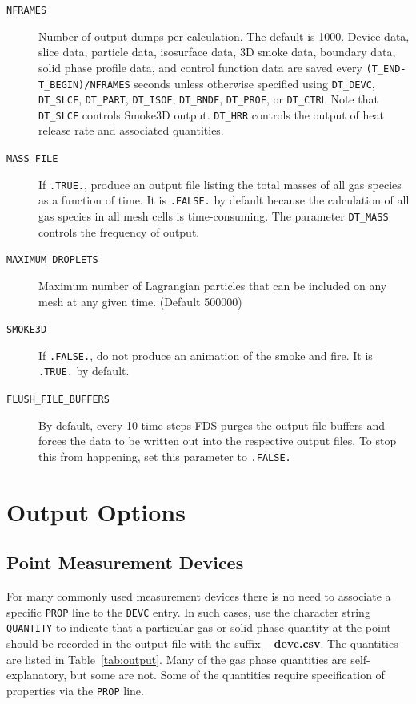 \documentclass[11pt]{book}
\newcommand{\ct}{\tt\small}
\begin{document}
\begin{description}
\item[{\ct NFRAMES}] Number of output dumps per calculation. The default is 1000.
Device data, slice data, particle data, isosurface data, 3D smoke data, boundary data, solid phase profile data, and
control function data are saved every {\ct (T\_END-T\_BEGIN)/NFRAMES} seconds unless otherwise specified
using {\ct DT\_DEVC}, {\ct DT\_SLCF}, {\ct DT\_PART}, {\ct DT\_ISOF}, {\ct DT\_BNDF}, {\ct DT\_PROF},
or {\ct DT\_CTRL} Note that {\ct DT\_SLCF} controls Smoke3D output. {\ct DT\_HRR} controls the
output of heat release rate and associated quantities.
\item[{\ct MASS\_FILE}] If {\ct .TRUE.}, produce an output file listing the total masses of all gas species as a function of time. It is {\ct .FALSE.} by default because the calculation
of all gas species in all mesh cells is time-consuming. The parameter {\ct DT\_MASS} controls the frequency of output.
\item[{\ct MAXIMUM\_DROPLETS}] Maximum number of Lagrangian particles that can be included on any
mesh at any given time. (Default 500000)
\item[{\ct SMOKE3D}] If {\ct .FALSE.}, do not produce an animation of the smoke and fire. It is {\ct .TRUE.} by default.
\item[{\ct FLUSH\_FILE\_BUFFERS}] By default, every 10 time steps FDS purges the output file buffers and forces the data to be written out into the respective output files. To stop
this from happening, set this parameter to {\ct .FALSE.}
\end{description}


\section{Output Options}

\subsection{Point Measurement Devices}
For many commonly used measurement devices there is no need to associate a
specific {\ct PROP} line to the {\ct DEVC} entry. In such cases, use the character string
{\ct QUANTITY} to indicate that a particular gas or solid phase quantity at the point should be recorded in
the output file with the suffix {\bf \_devc.csv}. The quantities are listed in Table~\ref{tab:output}.
Many of the gas phase quantities are self-explanatory, but some are not. Some of the quantities require specification of
properties via the {\ct PROP} line.
\end{document}
